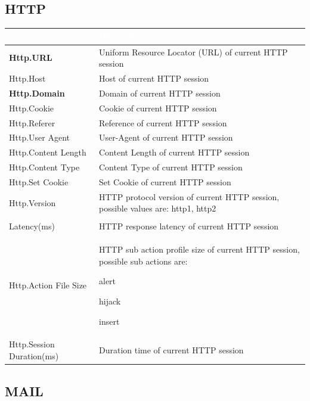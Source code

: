 \subsection*{\hypertarget{link:HTTP}{HTTP}}
\label{sec:appendix_c:protocol:HTTP}

\begin{longtable}{p{}|p{}}   
    \rowcolor{black}\multicolumn{1}{l!\vlinewhite}{\textcolor{white}{Field}}  & \textcolor{white}{Description} \\\hline
    \textbf{Http.URL} &	Uniform Resource Locator (URL) of current HTTP session \\\hline
    Http.Host &	Host of current HTTP session \\\hline
    \textbf{Http.Domain} &	Domain of current HTTP session \\\hline
    Http.Cookie &	Cookie of current HTTP session \\\hline
    Http.Referer &	Reference of current HTTP session \\\hline
    Http.User Agent &	User-Agent of current HTTP session \\\hline
    Http.Content Length &	Content Length of current HTTP session \\\hline
    Http.Content Type &	Content Type of current HTTP session \\\hline
    Http.Set Cookie &	Set Cookie of current HTTP session \\\hline
    Http.Version &	HTTP protocol version of current HTTP session, possible values are: http1, http2 \\\hline
    \tabincell{l}{Http.Response\\ Latency(ms)} &	HTTP response latency of current HTTP session \\\hline
    Http.Action File Size &	HTTP sub action profile size of current HTTP session, possible sub actions are:


                            alert


                            hijack


                            insert \\\hline
    Http.Session Duration(ms) &	Duration time of current HTTP session \\\hline
\end{longtable}

\subsection*{\hypertarget{link:MAIL}{MAIL}}
\label{sec:appendix_c:protocol:MAIL}

